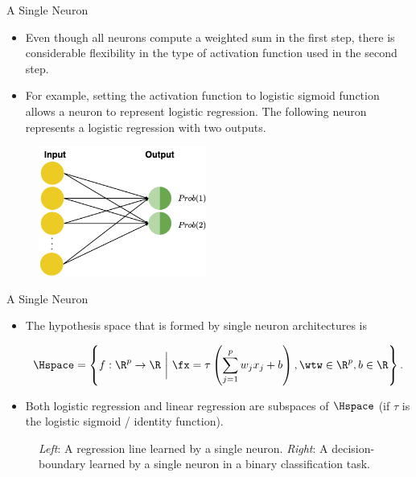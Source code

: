 \begin{vbframe} {A Single Neuron}
\begin{itemize}
\item Even though all neurons compute a weighted sum in the first step, there is considerable flexibility in the type of activation function used in the second step.
\item For example, setting the activation function to logistic sigmoid function allows a neuron to represent logistic regression. The following neuron represents a logistic regression with two outputs.
\end{itemize}
\begin{figure}
\includegraphics[width=5.5cm]{figure/logistic_regression.png}
\end{figure}
\end{vbframe}

\begin{vbframe}{A Single Neuron}
\begin{itemize}
\item The hypothesis space that is formed by single neuron architectures is 
\begin{small}
$$\Hspace  = \left\{f: \R^p \to \R ~\bigg|~ \fx = \tau\left(\sum_{j = 1}^p w_j x_j + b\right), \wtw \in \R^p, b \in \R\right\}.$$ 
\end{small}
\item Both logistic regression and linear regression are subspaces of $\Hspace$ (if $\tau$ is the logistic sigmoid / identity function).  \end{itemize}
\vspace*{-0.48cm}
\begin{figure}
\centering
{}
\vspace*{-0.2cm}
\begin{tiny}
\caption{\textit{Left}: A regression line learned by a single neuron. \textit{Right}: A decision-boundary learned by a single neuron in a binary classification task.}
\end{tiny}
\end{figure}
\end{vbframe}

